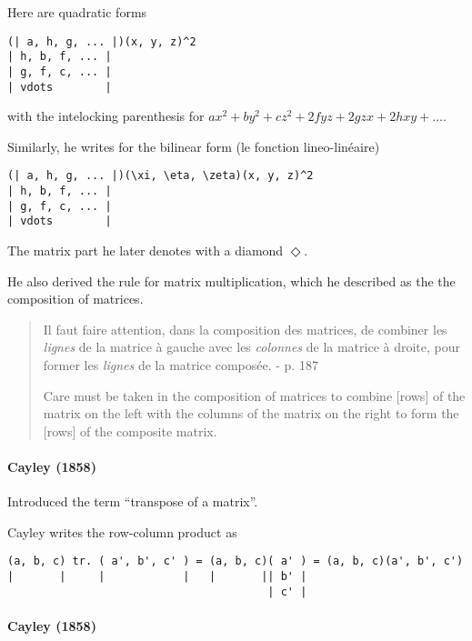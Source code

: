 Here are quadratic forms

\begin{verbatim}
(| a, h, g, ... |)(x, y, z)^2
| h, b, f, ... |
| g, f, c, ... |
| vdots        |
\end{verbatim}

with the intelocking parenthesis
for $ax^2 + by^2 + cz^2 + 2fyz + 2gzx + 2hxy + \dots$.

Similarly, he writes for the bilinear form (le fonction lineo-linéaire)

\begin{verbatim}
(| a, h, g, ... |)(\xi, \eta, \zeta)(x, y, z)^2
| h, b, f, ... |
| g, f, c, ... |
| vdots        |
\end{verbatim}

The matrix part he later denotes with a diamond $\Diamond$.

He also derived the rule for matrix multiplication, which he described as the
the composition of matrices.
\begin{quote}
Il faut faire attention, dans la composition des matrices, de combiner les \textit{lignes}
de la matrice à gauche avec les \textit{colonnes} de la matrice à droite, pour former les
\textit{lignes} de la matrice composée.
- p. 187

Care must be taken in the composition of matrices to combine [rows]
of the matrix on the left with the columns of the matrix on the right to form the
[rows] of the composite matrix.
\end{quote}



\paragraph{Cayley (1858)~\cite{Cayley1858}}

Introduced the term ``transpose of a matrix''.

Cayley writes the row-column product as

\begin{verbatim}
(a, b, c) tr. ( a', b', c' ) = (a, b, c)( a' ) = (a, b, c)(a', b', c')
|       |     |            |   |       || b' |
                                        | c' |
\end{verbatim}

\paragraph{Cayley (1858)~\cite{Cayley1858b}}

